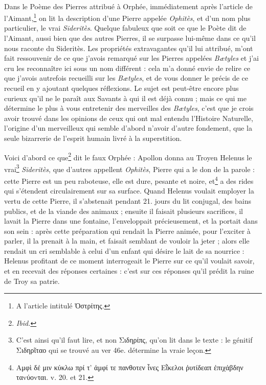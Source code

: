 \documentclass[a4paper, 11pt, oneside, polutonikogreek, french, landscape]{article}
\begin{document}
\paragraph{}
Dans le Poème des Pierres attribué à Orphée, immédiatement après l'article de l'Aimant,\footnote{A l'article intitulé Ὀστρίτης.} on lit la description d'une Pierre appelée \emph{Ophitès}, et d'un nom plus particulier, le vrai \emph{Sideritès}. Quelque fabuleux que soit ce que le Poète dit de l'Aimant, aussi bien que des autres Pierres, il se surpasse lui-même dans ce qu'il nous raconte du Sideritès. Les propriétés extravagantes qu'il lui attribué, m'ont fait ressouvenir de ce que j'avois remarqué sur les Pierres appelées \emph{Bætyles} et j'ai cru les reconnaître ici sous un nom différent : cela m'a donné envie de relire ce que j'avois autrefois recueilli sur les \emph{Bætyles}, et de vous donner le précis de ce recueil en y ajoutant quelques réflexions. Le sujet est peut-être encore plus curieux qu'il ne le paraît aux Savants à qui il est déjà connu ; mais ce qui me détermine le plus à vous entretenir des merveilles des \emph{Bætyles}, c'est que je crois avoir trouvé dans les opinions de ceux qui ont mal entendu l'Histoire Naturelle, l'origine d'un merveilleux qui semble d'abord n'avoir d'autre fondement, que la seule bizarrerie de l'esprit humain livré à la superstition.

Voici d'abord ce que\footnote{\emph{Ibid.}} dit le faux Orphée : Apollon donna au Troyen Helenus le vrai\footnote{C'est ainsi qu'il faut lire, et non Σιδηρίπς, qu'on lit dans le texte : le génitif Σιδηρῖταο qui se trouvé au ver 46e. détermine la vraie leçon.} \emph{Sideritès}, que d'autres appellent \emph{Ophitès}, Pierre qui a le don de la parole : cette Pierre est un peu raboteuse, elle est dure, pesante et noire, et\footnote{Αμφὶ δέ μιν κύκλω πρί τ' ἀμφί τε πανθοτεν ἶνες Εῗκελοι ῥυτίδεαπ ἐπιχάβδην ταvύοvται. v. 20. et 21.} a des rides qui s'étendent circulairement sur sa surface. Quand Helenus voulait employer la vertu de cette Pierre, il s'abstenait pendant 21. jours du lit conjugal, des bains publics, et de la viande des animaux ; ensuite il faisait plusieurs sacrifices, il lavait la Pierre dans une fontaine, l'enveloppait précieusement, et la portait dans son sein : après cette préparation qui rendait la Pierre animée, pour l'exciter à parler, il la prenait à la main, et faisait semblant de vouloir la jeter ; alors elle rendait un cri semblable à celui d'un enfant qui désire le lait de sa nourrice : Helenus profitant de ce moment interrogeait le Pierre sur ce qu'il voulait savoir, et en recevait des réponses certaines : c'est sur ces réponses qu'il prédit la ruine de Troy sa patrie.
\end{document}
